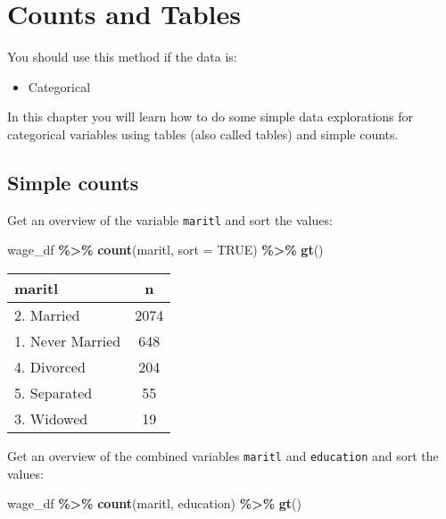 \documentclass[
]{book}
\newenvironment{Shaded}{\begin{snugshade}}{\end{snugshade}}
\newcommand{\DataTypeTok}[1]{\textcolor[rgb]{0.13,0.29,0.53}{#1}}
\newcommand{\KeywordTok}[1]{\textcolor[rgb]{0.13,0.29,0.53}{\textbf{#1}}}
\newcommand{\NormalTok}[1]{#1}
\newcommand{\OperatorTok}[1]{\textcolor[rgb]{0.81,0.36,0.00}{\textbf{#1}}}
\newcommand{\OtherTok}[1]{\textcolor[rgb]{0.56,0.35,0.01}{#1}}
\newcommand{\StringTok}[1]{\textcolor[rgb]{0.31,0.60,0.02}{#1}}
\providecommand{\tightlist}{%
  \setlength{\itemsep}{0pt}\setlength{\parskip}{0pt}}
\begin{document}
\hypertarget{tables}{%
\chapter{Counts and Tables}\label{tables}}

You should use this method if the data is:

\begin{itemize}
\tightlist
\item
  Categorical
\end{itemize}

In this chapter you will learn how to do some simple data explorations for categorical variables using tables (also called tables) and simple counts.

\hypertarget{simple-counts}{%
\section{Simple counts}\label{simple-counts}}

Get an overview of the variable \texttt{maritl} and sort the values:

\begin{Shaded}
\begin{Highlighting}[]
\NormalTok{wage\_df }\OperatorTok{\%\textgreater{}\%}\StringTok{ }
\StringTok{  }\KeywordTok{count}\NormalTok{(maritl,}
  \DataTypeTok{sort =} \OtherTok{TRUE}\NormalTok{) }\OperatorTok{\%\textgreater{}\%}\StringTok{ }
\StringTok{  }\KeywordTok{gt}\NormalTok{()}
\end{Highlighting}
\end{Shaded}

\captionsetup[table]{labelformat=empty,skip=1pt}
\begin{longtable}{lc}
\toprule
maritl & n \\ 
\midrule
2. Married & 2074 \\ 
1. Never Married & 648 \\ 
4. Divorced & 204 \\ 
5. Separated & 55 \\ 
3. Widowed & 19 \\ 
\bottomrule
\end{longtable}

Get an overview of the combined variables \texttt{maritl} and \texttt{education} and sort the values:

\begin{Shaded}
\begin{Highlighting}[]
\NormalTok{wage\_df }\OperatorTok{\%\textgreater{}\%}\StringTok{ }
\StringTok{  }\KeywordTok{count}\NormalTok{(maritl, education) }\OperatorTok{\%\textgreater{}\%}\StringTok{ }
\StringTok{  }\KeywordTok{gt}\NormalTok{()}
\end{Highlighting}
\end{Shaded}
\end{document}
